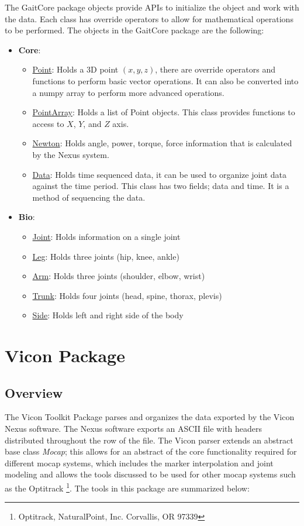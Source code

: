 The GaitCore package objects provide APIs to initialize the object and work with the data. Each class has override operators to allow for mathematical operations to be performed. The objects in the GaitCore package are the following:

\begin{itemize}[noitemsep]
\item \textbf{Core}:
\begin{itemize}[noitemsep]
    \item \underline{Point}: Holds a 3D point $(x,y,z)$, there are override operators and functions to perform basic vector operations. It can also be converted into a numpy array to perform more advanced operations.
    \item \underline{PointArray}: Holds a list of Point objects. This class provides functions to access to $X$, $Y$, and $Z$ axis. 
    \item \underline{Newton}: Holds angle, power, torque, force information that is calculated by the Nexus system. 
    \item \underline{Data}: Holds time sequenced data, it can be used to organize joint data against the time period. This class has two fields; data and time. It is a method of sequencing the data.  
\end{itemize}
\item \textbf{Bio}:
\begin{itemize}
    \item \underline{Joint}: Holds information on a single joint
    \item \underline{Leg}: Holds three joints (hip, knee, ankle)
    \item \underline{Arm}: Holds three joints (shoulder, elbow, wrist)
    \item \underline{Trunk}: Holds four joints (head, spine, thorax, plevis)
    \item \underline{Side}: Holds left and right side of the body
\end{itemize}
\end{itemize}




\section{Vicon Package}
\subsection{Overview}
The Vicon Toolkit Package parses and organizes the data exported by the Vicon Nexus software. The Nexus software exports an ASCII file with headers distributed throughout the row of the file. The Vicon parser extends an abstract base class \textit{Mocap}; this allows for an abstract of the core functionality required for different mocap systems, which includes the marker interpolation and joint modeling and allows the tools discussed to be used for other mocap systems such as the Optitrack \footnote{Optitrack, NaturalPoint, Inc. Corvallis, OR 97339}.  
 The tools in this package are summarized below: 

